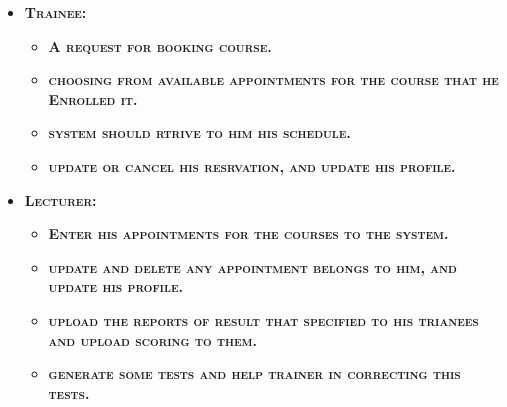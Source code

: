 \documentclass[../Psychological_system_web_application.tex]{subfiles}
\begin{document}
					\begin{itemize}
					\item
							\textbf{\textsc{\color{red}Trainee:}}
					\begin{itemize}
						\item
							\textbf{\textsc{\color{blue}A request for booking course.}}
						\item
							\textbf{\textsc{\color{blue}choosing from available appointments for the course that he Enrolled it.}}
						\item
							\textbf{\textsc{\color{blue}system should rtrive to him his schedule.}}
						\item
							\textbf{\textsc{\color{blue}update or cancel his resrvation, and update his profile.}}
					\end{itemize}
					
					\item
							\textbf{\textsc{\color{red}Lecturer:}}
							\begin{itemize}
							\item
								\textbf{\textsc{\color{blue}Enter his appointments for the courses to the system.}}
							\item
								\textbf{\textsc{\color{blue}update and delete any appointment belongs to him, and update his profile.}}
							\item
								\textbf{\textsc{\color{blue}upload the reports of result that specified to his trianees and upload scoring to them.}}
							\item
								\textbf{\textsc{\color{blue}generate some tests and help trainer in correcting this tests.}}
					\end{itemize}
				\end{itemize}
		
\end{document}
